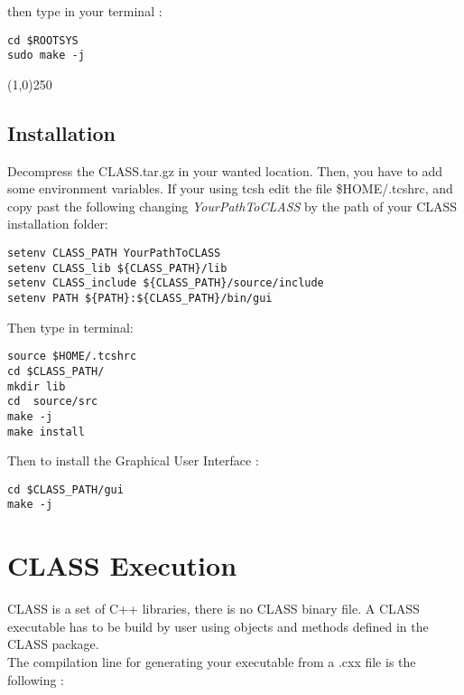 then type in your terminal : 

\begin{center}
\begin{minipage}{\textwidth}
\begin{lstlisting}[style=terminal]
cd $ROOTSYS
sudo make -j
\end{lstlisting}
\end{minipage}
\end{center}

\begin{center}
\line(1,0){250}
\end{center}


\section{Installation}
Decompress the CLASS.tar.gz in your wanted location. Then, you have to add some environment variables. If your using tcsh  edit the file \$HOME/.tcshrc, and copy past the following  changing \emph{YourPathToCLASS} by the path  of your CLASS installation folder:
\begin{center}
\begin{minipage}{\textwidth}
\begin{lstlisting}
setenv CLASS_PATH YourPathToCLASS
setenv CLASS_lib ${CLASS_PATH}/lib
setenv CLASS_include ${CLASS_PATH}/source/include
setenv PATH ${PATH}:${CLASS_PATH}/bin/gui
\end{lstlisting}
\end{minipage}
\end{center}
 Then type in terminal:
\begin{center}
\begin{minipage}{\textwidth}
\begin{lstlisting}[style=terminal]
source $HOME/.tcshrc
cd $CLASS_PATH/
mkdir lib
cd  source/src
make -j 
make install
\end{lstlisting}
\end{minipage}
\end{center}
Then to install the Graphical User Interface :
\begin{center}
\begin{minipage}{\textwidth}
\begin{lstlisting}[style=terminal]
cd $CLASS_PATH/gui
make -j
\end{lstlisting}
\end{minipage}
\end{center}


\chapter{CLASS Execution}
CLASS is a set of C++ libraries, there is no CLASS binary file. A CLASS executable has to be build by user using objects and methods defined in the CLASS package. \\
The compilation line for generating your executable from a .cxx file is the following :

